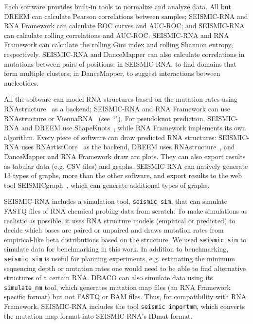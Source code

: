 \documentclass[unnumsec,webpdf,contemporary,large]{oup-authoring-template}%
\theoremstyle{thmstyleone}%
\theoremstyle{thmstyletwo}%
\theoremstyle{thmstylethree}%
\begin{document}
Each software provides built-in tools to normalize and analyze data.
All but DREEM can calculate Pearson correlations between samples; SEISMIC-RNA and RNA Framework can calculate ROC curves and AUC-ROC; and SEISMIC-RNA can calculate rolling correlations and AUC-ROC.
SEISMIC-RNA and RNA Framework can calculate the rolling Gini index and rolling Shannon entropy, respectively.
SEISMIC-RNA and DanceMapper can also calculate correlations in mutations between pairs of positions; in SEISMIC-RNA, to find domains that form multiple clusters; in DanceMapper, to suggest interactions between nucleotides.

All the software can model RNA structures based on the mutation rates using RNAstructure~\cite{Reuter2010} as a backend; SEISMIC-RNA and RNA Framework can use RNAstructure or ViennaRNA~\cite{Lorenz2011} (see ``").
For pseudoknot prediction, SEISMIC-RNA and DREEM use ShapeKnots~\cite{Hajdin2013}, while RNA Framework implements its own algorithm.
Every piece of software can draw predicted RNA structures: SEISMIC-RNA uses RNArtistCore~\cite{RNArtistCore} as the backend, DREEM uses RNAstructure~\cite{Reuter2010}, and DanceMapper and RNA Framework draw arc plots. They can also export results as tabular data (e.g. CSV files) and graphs.
SEISMIC-RNA can natively generate 13 types of graphs, more than the other software, and export results to the web tool SEISMICgraph~\cite{FuchsWightman2025}, which can generate additional types of graphs.

SEISMIC-RNA includes a simulation tool, \verb|seismic sim|, that can simulate FASTQ files of RNA chemical probing data from scratch.
To make simulations as realistic as possible, it uses RNA structure models (empirical or predicted) to decide which bases are paired or unpaired and draws mutation rates from empirical-like beta distributions based on the structure.
We used \verb|seismic sim| to simulate data for benchmarking in this work.
In addition to benchmarking, \verb|seismic sim| is useful for planning experiments, e.g. estimating the minimum sequencing depth or mutation rates one would need to be able to find alternative structures of a certain RNA.
DRACO can also simulate data using its \verb|simulate_mm| tool, which generates mutation map files (an RNA Framework specific format) but not FASTQ or BAM files.
Thus, for compatibility with RNA Framework, SEISMIC-RNA includes the tool \verb|seismic importmm|, which converts the mutation map format into SEISMIC-RNA's IDmut format.
\end{document}
